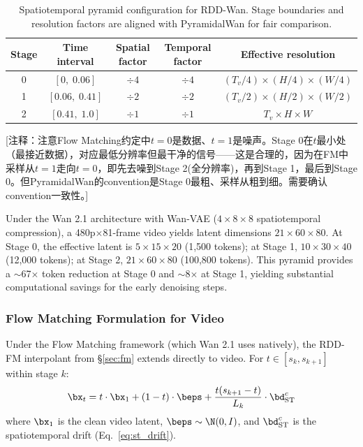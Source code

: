 \begin{table}[h]
\centering
\small
\caption{Spatiotemporal pyramid configuration for RDD-Wan. Stage boundaries and resolution factors are aligned with PyramidalWan for fair comparison.}
\label{tab:video_stages}
\begin{tabular}{@{}ccccc@{}}
\toprule
\textbf{Stage} & \textbf{Time interval} & \textbf{Spatial factor} & \textbf{Temporal factor} & \textbf{Effective resolution} \\
\midrule
0 & $[0,\; 0.06]$ & $\div 4$ & $\div 4$ & $(T_v/4) \times (H/4) \times (W/4)$ \\
1 & $[0.06,\; 0.41]$ & $\div 2$ & $\div 2$ & $(T_v/2) \times (H/2) \times (W/2)$ \\
2 & $[0.41,\; 1.0]$ & $\div 1$ & $\div 1$ & $T_v \times H \times W$ \\
\bottomrule
\end{tabular}
\end{table}

\textcolor{green!50!black}{[注释：注意Flow Matching约定中$t{=}0$是数据、$t{=}1$是噪声。Stage 0在$t$最小处（最接近数据），对应最低分辨率但最干净的信号——这是合理的，因为在FM中采样从$t{=}1$走向$t{=}0$，即先去噪到Stage 2(全分辨率)，再到Stage 1，最后到Stage 0。但PyramidalWan的convention是Stage 0最粗、采样从粗到细。需要确认convention一致性。]}

Under the Wan 2.1 architecture with Wan-VAE ($4\times 8\times 8$ spatiotemporal compression), a 480p$\times$81-frame video yields latent dimensions $21 \times 60 \times 80$.
At Stage 0, the effective latent is $5 \times 15 \times 20$ (1,500 tokens); at Stage 1, $10 \times 30 \times 40$ (12,000 tokens); at Stage 2, $21 \times 60 \times 80$ (100,800 tokens).
This pyramid provides a $\sim$67$\times$ token reduction at Stage 0 and $\sim$8$\times$ at Stage 1, yielding substantial computational savings for the early denoising steps.

\subsubsection{Flow Matching Formulation for Video}

Under the Flow Matching framework (which Wan 2.1 uses natively), the RDD-FM interpolant from \S\ref{sec:fm} extends directly to video.
For $t \in [s_k, s_{k+1}]$ within stage $k$:
\begin{equation}
    \bx_t = t \cdot \bx_1 + (1-t) \cdot \beps + \frac{t(s_{k+1} - t)}{L_k} \cdot \bd^c_{\text{ST}}
    \label{eq:video_fm_interpolant}
\end{equation}
where $\bx_1$ is the clean video latent, $\beps \sim \N(0, I)$, and $\bd^c_{\text{ST}}$ is the spatiotemporal drift (Eq.~\ref{eq:st_drift}).

